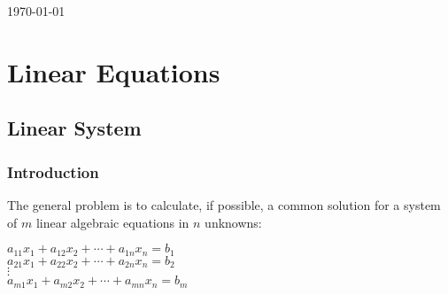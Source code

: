 \documentclass[UTF8,a4paper,11pt]{amsbook}
\begin{document}
\begin{titlepage}



{\large \today}\\[2cm] %

\vspace{5cm}



\vfill %
\end{titlepage}


\tableofcontents

\mainmatter
\chapter{Linear Equations}
\section{Linear System}
\subsection{Introduction}
The general problem is to calculate, if possible, a common solution
for a system of $m$ linear algebraic equations in $n$ unknowns:

\begin{center}
$a_{11}x_1+a_{12}x_{2}+\cdots +a_{1n}x_{n} = b_{1}$\\
$a_{21}x_1+a_{22}x_{2}+\cdots +a_{2n}x_{n} = b_{2}$\\
$\vdots$\\
$a_{m1}x_1+a_{m2}x_{2}+\cdots +a_{mn}x_{n} = b_{m}$\\
\end{center}
\end{document}
